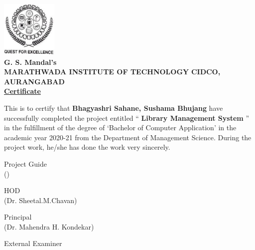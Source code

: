 \documentclass[12pt, a4paper]{report}
\begin{document}
\newpage
\thispagestyle{empty}
\begin{center}
	\includegraphics[width=0.20\textwidth]{./mit}\\
	\small \textbf{G. S. Mandal’s} \\[0.1in]
	\large \textbf {MARATHWADA INSTITUTE OF TECHNOLOGY}
	\large \textbf{CIDCO, AURANGABAD}\\
	
	\vspace{1cm}
	\normalsize \textbf {\underline {Certificate}}\\[1cm]
\end{center}
\normalsize This is to certify that \textbf{Bhagyashri Sahane, Sushama Bhujang} have successfully completed the project entitled “ \textbf{Library Management System} ” in the fulfillment of the degree of ‘Bachelor of Computer Application’ in the academic year 2020-21 from the Department of Management Science. 
\newline
\newline
During the project work, he/she has done the work very sincerely.
\\[1.0cm]

\begin{flushright}
	Project Guide \hspace{2cm} \\
	(\hspace{2.5cm})\\[1.5cm]
\end{flushright}

\begin{flushleft}
	\hspace{1.5cm} HOD\\
	(Dr. Sheetal.M.Chavan)
\end{flushleft}

\begin{flushright}
	Principal \hspace{2.5cm}\\
	(Dr. Mahendra H. Kondekar)
\end{flushright}

\begin{flushleft}
	External Examiner
\end{flushleft}
\end{document}
